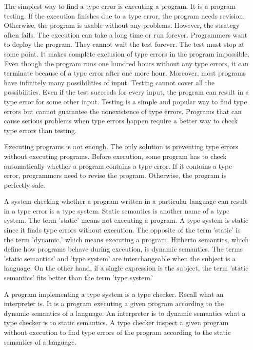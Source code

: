 The simplest way to find a type error is executing a program. It is a program
testing. If the execution finishes due to a type error, the program needs
revision. Otherwise, the program is usable without any problems. However, the
strategy often fails. The execution can take a long time or run forever.
Programmers want to deploy the program. They cannot wait the test forever. The
test must stop at some point. It makes complete exclusion of type errors in the
program impossible. Even though the program runs one hundred hours without any
type errors, it can terminate because of a type error after one more hour.
Moreover, most programs have infinitely many possibilities of input. Testing
cannot cover all the possibilities. Even if the test succeeds for every input,
the program can result in a type error for some other input. Testing is a simple
and popular way to find type errors but cannot guarantee the nonexistence of type
errors. Programs that can cause serious problems when type errors happen require
a better way to check type errors than testing.

Executing programs is not enough. The only solution is preventing type errors
without executing programs. Before execution, some program has to check
automatically whether a program contains a type error. If it contains a type
error, programmers need to revise the program. Otherwise, the program is
perfectly safe.

A system checking whether a program written in a particular language can result
in a type error is a type system. Static semantics is another name of a type
system. The term 'static' means not executing a program. A type system is static
since it finds type errors without execution. The opposite of the term 'static'
is the term 'dynamic,' which means executing a program. Hitherto semantics, which
define how programs behave during execution, is dynamic semantics. The terms
'static semantics' and 'type system' are interchangeable when the subject is a
language. On the other hand, if a single expression is the subject, the term
'static semantics' fits better than the term 'type system.'

A program implementing a type system is a type checker. Recall what an
interpreter is. It is a program executing a given program according to the
dynamic semantics of a language. An interpreter is to dynamic semantics what a
type checker is to static semantics. A type checker inspect a given program
without execution to find type errors of the program according to the static
semantics of a language.

